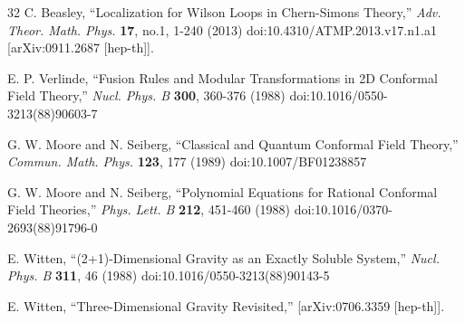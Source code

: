 \documentclass[11pt,a4paper]{article}
\begin{document}
\begin{thebibliography}{32}
 C. Beasley, ``Localization for Wilson Loops in Chern-Simons Theory,'' \emph{Adv. Theor. Math. Phys.} \textbf{17}, no.1, 1-240 (2013) doi:10.4310/ATMP.2013.v17.n1.a1 [arXiv:0911.2687 [hep-th]].

 E. P. Verlinde, ``Fusion Rules and Modular Transformations in 2D Conformal Field Theory,'' \emph{Nucl. Phys. B} \textbf{300}, 360-376 (1988) doi:10.1016/0550-3213(88)90603-7

 G. W. Moore and N. Seiberg, ``Classical and Quantum Conformal Field Theory,'' \emph{Commun. Math. Phys.} \textbf{123}, 177 (1989) doi:10.1007/BF01238857

 G. W. Moore and N. Seiberg, ``Polynomial Equations for Rational Conformal Field Theories,'' \emph{Phys. Lett. B} \textbf{212}, 451-460 (1988) doi:10.1016/0370-2693(88)91796-0

 E. Witten, ``(2+1)-Dimensional Gravity as an Exactly Soluble System,'' \emph{Nucl. Phys. B} \textbf{311}, 46 (1988) doi:10.1016/0550-3213(88)90143-5

 E. Witten, ``Three-Dimensional Gravity Revisited,'' [arXiv:0706.3359 [hep-th]].

\end{thebibliography}

\end{document}
